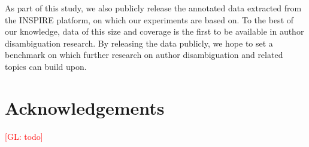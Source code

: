 \documentclass{article}
\newcommand{\glnote}[1]{\textcolor{red}{[GL: #1]}}
\begin{document}
As part of this study, we also publicly release the annotated data extracted
from the INSPIRE platform, on which our experiments are based on. To the
best of our knowledge, data of this size and coverage is the first to be
available in  author disambiguation research. By releasing the data publicly,
we hope to set a benchmark on which further research on author disambiguation
and related topics can  build upon.




\section*{Acknowledgements}

\glnote{todo}





\end{document}
